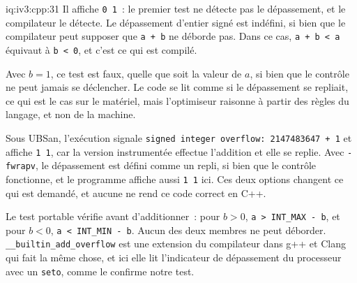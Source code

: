 \begin{solution}{iq:iv3:cpp:31}
Il affiche \texttt{0 1}~: le premier test ne détecte pas le dépassement, et le compilateur le détecte. Le dépassement d'entier signé est indéfini, si bien que le compilateur peut supposer que \texttt{a + b} ne déborde pas. Dans ce cas, \texttt{a + b < a} équivaut à \texttt{b < 0}, et c'est ce qui est compilé.

Avec $b = 1$, ce test est faux, quelle que soit la valeur de $a$, si bien que le contrôle ne peut jamais se déclencher. Le code se lit comme si le dépassement se repliait, ce qui est le cas sur le matériel, mais l'optimiseur raisonne à partir des règles du langage, et non de la machine.

Sous UBSan, l'exécution signale \texttt{signed integer overflow: 2147483647 + 1} et affiche \texttt{1 1}, car la version instrumentée effectue l'addition et elle se replie. Avec \texttt{-fwrapv}, le dépassement est défini comme un repli, si bien que le contrôle fonctionne, et le programme affiche aussi \texttt{1 1} ici. Ces deux options changent ce qui est demandé, et aucune ne rend ce code correct en C++.

Le test portable vérifie avant d'additionner~: pour $b > 0$, \texttt{a > INT\_MAX - b}, et pour $b < 0$, \texttt{a < INT\_MIN - b}. Aucun des deux membres ne peut déborder. \texttt{\_\_builtin\_add\_overflow} est une extension du compilateur dans g++ et Clang qui fait la même chose, et ici elle lit l'indicateur de dépassement du processeur avec un \texttt{seto}, comme le confirme notre test.

\end{solution}

